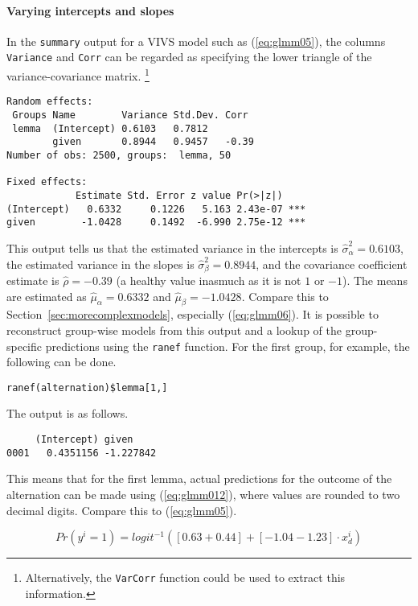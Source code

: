 \paragraph{Varying intercepts and slopes}

In the \texttt{summary} output for a VIVS model such as (\ref{eq:glmm05}), the columns \texttt{Variance} and \texttt{Corr} can be regarded as specifying the lower triangle of the variance-covariance matrix.%
\footnote{Alternatively, the \texttt{VarCorr} function could be used to extract this information.}

\vspace{0.5\baselineskip}

\begin{lstlisting}
Random effects:
 Groups Name        Variance Std.Dev. Corr 
 lemma  (Intercept) 0.6103   0.7812        
        given       0.8944   0.9457   -0.39
Number of obs: 2500, groups:  lemma, 50

Fixed effects:
            Estimate Std. Error z value Pr(>|z|)    
(Intercept)   0.6332     0.1226   5.163 2.43e-07 ***
given        -1.0428     0.1492  -6.990 2.75e-12 ***
\end{lstlisting}

This output tells us that the estimated variance in the intercepts is $\hat{\sigma}_{\alpha}^2=0.6103$, the estimated variance in the slopes is $\hat{\sigma}_{\beta}^2=0.8944$, and the covariance coefficient estimate is $\hat{\rho}=-0.39$ (a healthy value inasmuch as it is not $1$ or $-1$).
The means are estimated as $\hat{\mu}_{\alpha}=0.6332$ and $\hat{\mu}_{\beta}=-1.0428$.
Compare this to Section~\ref{sec:morecomplexmodels}, especially (\ref{eq:glmm06}).
It is possible to reconstruct group-wise models from this output and a lookup of the group-specific predictions using the \texttt{ranef} function.
For the first group, for example, the following can be done.

\vspace{0.5\baselineskip}

\begin{lstlisting}
ranef(alternation)$lemma[1,]
\end{lstlisting}

The output is as follows.

\vspace{0.5\baselineskip}

\begin{lstlisting}
     (Intercept) given
0001   0.4351156 -1.227842
\end{lstlisting}

This means that for the first lemma, actual predictions for the outcome of the alternation can be made using (\ref{eq:glmm012}), where values are rounded to two decimal digits.
Compare this to (\ref{eq:glmm05}).

\begin{equation}
  Pr(y^i=1)=logit^{-1}( [0.63+0.44] + [-1.04-1.23]\cdot x_d^i )
  \label{eq:glmm012}
\end{equation}

